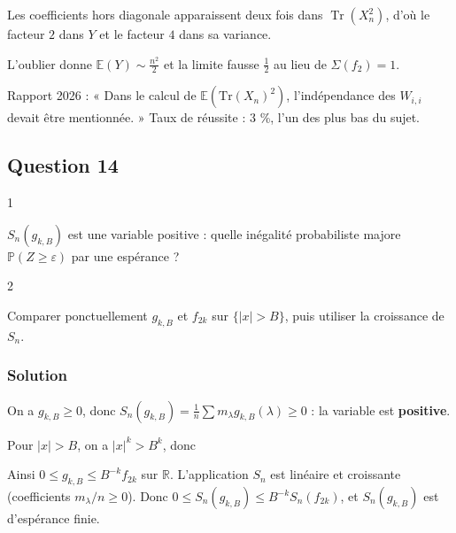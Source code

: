 \documentclass[11pt,a4paper]{article}
\newcommand{\equationajustee}[1]{%
  \sbox{\boiteequation}{$\displaystyle #1$}%
  \ifdim\wd\boiteequation>\linewidth
    \[\resizebox{\linewidth}{!}{\usebox{\boiteequation}}\]%
  \else
    \[#1\]%
  \fi}
\begin{document}
\begin{piege}

Les coefficients hors diagonale apparaissent deux fois dans \(\operatorname{Tr}(X_n^2)\), d'où le facteur \(2\) dans \(Y\) et le facteur \(4\) dans sa variance.

L'oublier donne \(\mathbb E(Y)\sim\frac{n^2}2\) et la limite fausse \(\frac12\) au lieu de \(\Sigma(f_2)=1\).

\end{piege}

\begin{jury}

Rapport 2026 : « Dans le calcul de \(\mathbb E(\mathrm{Tr}(X_n)^2)\), l'indépendance des \(W_{i,i}\) devait être mentionnée. » Taux de réussite : 3 \%, l'un des plus bas du sujet.

\end{jury}

\hypertarget{question-14}{%
\subsection{Question 14}\label{question-14}}

\begin{indication}{1}

\(S_n(g_{k,B})\) est une variable positive : quelle inégalité probabiliste majore \(\mathbb P(Z\ge\varepsilon)\) par une espérance ?

\end{indication}

\begin{indication}{2}

Comparer ponctuellement \(g_{k,B}\) et \(f_{2k}\) sur \(\{|x|>B\}\), puis utiliser la croissance de \(S_n\).

\end{indication}

\hypertarget{solution-25}{%
\subsubsection{Solution}\label{solution-25}}

On a \(g_{k,B}\ge0\), donc \(S_n(g_{k,B})=\frac1n\sum m_\lambda g_{k,B}(\lambda)\ge0\) : la variable est \textbf{positive}.

Pour \(|x|>B\), on a \(|x|^k>B^k\), donc

\equationajustee{|x|^k=\frac{x^{2k}}{|x|^k}\le\frac{x^{2k}}{B^k}.}

Ainsi \(0\le g_{k,B}\le B^{-k}f_{2k}\) sur \(\mathbb R\). L'application \(S_n\) est linéaire et croissante (coefficients \(m_\lambda/n\ge0\)). Donc \(0\le S_n(g_{k,B})\le B^{-k}S_n(f_{2k})\), et \(S_n(g_{k,B})\) est d'espérance finie.
\end{document}
